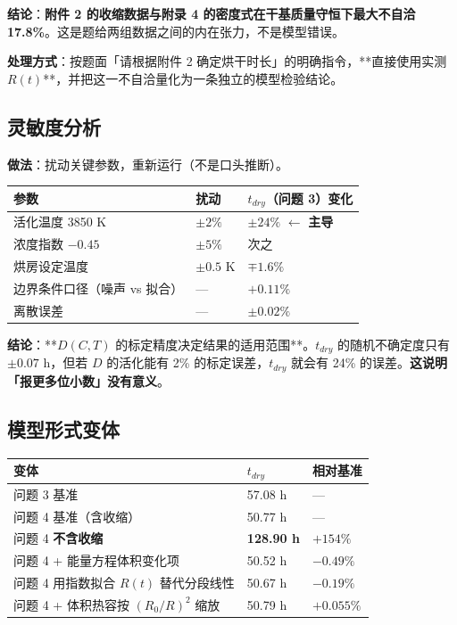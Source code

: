 \textbf{结论}：\textbf{附件 2 的收缩数据与附录 4 的密度式在干基质量守恒下最大不自洽 17.8\%}。这是题给两组数据之间的内在张力，不是模型错误。


\textbf{处理方式}：按题面「请根据附件 2 确定烘干时长」的明确指令，**直接使用实测 $R(t)$**，并把这一不自洽量化为一条独立的模型检验结论。


\subsection{灵敏度分析}


\textbf{做法}：扰动关键参数，重新运行（不是口头推断）。


\begin{center}
\small
\begin{tabular}{lll}
\toprule
参数 & 扰动 & $t_{dry}$（问题 3）变化 \\
\midrule
活化温度 3850 K & $\pm2\%$ & $\pm24\%$ $\leftarrow$ \textbf{主导} \\
浓度指数 $-0.45$ & $\pm5\%$ & 次之 \\
烘房设定温度 & $\pm0.5$ K & $\mp1.6\%$ \\
边界条件口径（噪声 vs 拟合） & — & $+0.11\%$ \\
离散误差 & — & $\pm0.02\%$ \\
\bottomrule
\end{tabular}
\end{center}


\textbf{结论}：**$D(C,T)$ 的标定精度决定结果的适用范围**。$t_{dry}$ 的随机不确定度只有 $\pm0.07$ h，但若 $D$ 的活化能有 2\% 的标定误差，$t_{dry}$ 就会有 24\% 的误差。\textbf{这说明「报更多位小数」没有意义}。


\subsection{模型形式变体}


\begin{center}
\small
\begin{tabular}{lll}
\toprule
变体 & $t_{dry}$ & 相对基准 \\
\midrule
问题 3 基准 & 57.08 h & — \\
问题 4 基准（含收缩） & 50.77 h & — \\
问题 4 \textbf{不含收缩} & \textbf{128.90 h} & $+154\%$ \\
问题 4 + 能量方程体积变化项 & 50.52 h & $-0.49\%$ \\
问题 4 用指数拟合 $R(t)$ 替代分段线性 & 50.67 h & $-0.19\%$ \\
问题 4 + 体积热容按 $(R_0/R)^2$ 缩放 & 50.79 h & $+0.055\%$ \\
\bottomrule
\end{tabular}
\end{center}


